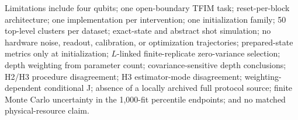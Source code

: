 \documentclass[pdflatex,sn-basic,Numbered]{sn-jnl}
\begin{document}
Limitations include four qubits; one open-boundary TFIM task; reset-per-block architecture; one implementation per intervention; one initialization family; 50 top-level clusters per dataset; exact-state and abstract shot simulation; no hardware noise, readout, calibration, or optimization trajectories; prepared-state metrics only at initialization; $L$-linked finite-replicate zero-variance selection; depth weighting from parameter count; covariance-sensitive depth conclusions; H2/H3 procedure disagreement; H3 estimator-mode disagreement; weighting-dependent conditional J; absence of a locally archived full protocol source; finite Monte Carlo uncertainty in the 1,000-fit percentile endpoints; and no matched physical-resource claim.
\end{document}

